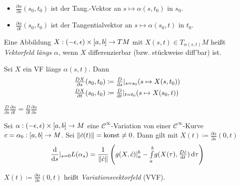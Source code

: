 \documentclass{cheat-sheet}
\newcommand{\vinterval}{\ointerval{-\epsilon}{\epsilon}} %
\newcommand{\abinterval}{\cinterval{a}{b}} %
\begin{document}
\begin{nota}
  \begin{itemize}
    \item $\tfrac{\partial \alpha}{\partial s} (s_0, t_0)$ ist der Tang.-Vektor an $s {\mapsto} \alpha(s, t_0)$ in $s_0$.
    \item $\tfrac{\partial \alpha}{\partial t} (s_0, t_0)$ ist der Tangentialvektor an $s \mapsto \alpha(s_0, t)$ in $t_0$.
  \end{itemize}
\end{nota}

\begin{defn}
  Eine Abbildung $X : \vinterval \times \abinterval \to TM$ mit $X(s, t) \in T_{\alpha(s, t)} M$ heißt \emph{Vektorfeld längs $\alpha$}, wenn $X$ differenzierbar (bzw. stückweise diff'bar) ist.
\end{defn}

\begin{nota}
  Sei $X$ ein VF längs $\alpha(s, t)$. Dann
  \begin{align*}
    \tfrac{D X}{\partial s} (s_0, t_0) & \coloneqq \tfrac{D}{\mathrm{d} s} |_{s=s_0} (s \mapsto X(s, t_0)) \\
    \tfrac{D X}{\partial t} (s_0, t_0) & \coloneqq \tfrac{D}{\mathrm{d} t} |_{t=t_0} (s \mapsto X(s_0, t))
  \end{align*}
\end{nota}

\begin{lem}
  $\frac{D}{\partial s} \frac{\partial \alpha}{\partial t} = \frac{D}{\partial t} \frac{\partial \alpha}{\partial s}$
\end{lem}

\begin{satz}
  Sei $\alpha : \vinterval \times \abinterval \to M$ eine $\mathcal{C}^\infty$-Variation von einer $\mathcal{C}^\infty$-Kurve $c = \alpha_0 : \abinterval \to M$. Sei $\lVert\dot{c}(t)\rVert = \text{konst} \not= 0$. Dann gilt mit $X(t) \coloneqq \tfrac{\partial \alpha}{\partial s} (0, t)$
  \[ \frac{\mathrm{d}}{\mathrm{d} s} |_{s=0} L(\alpha_s) = \frac{1}{\lVert\dot{c}\rVert} \left( g(X, \dot{c})|_a^b - {\textstyle \int\limits_{a}^{b}} g(X(\tau), \tfrac{D \dot{c}}{\mathrm{d} t}) \,\mathrm{d} \tau \right) \]
\end{satz}

\begin{sprech}
  $X(t) \coloneqq \tfrac{\partial \alpha}{\partial s} (0, t)$ heißt \emph{Variationsvektorfeld} (VVF).
\end{sprech}
\end{document}
